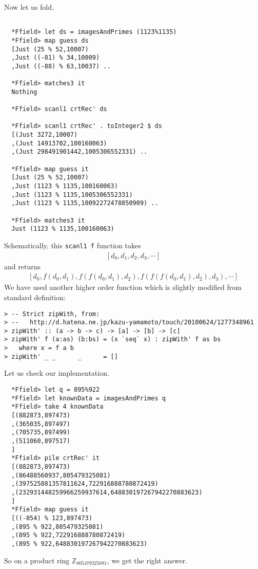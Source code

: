 \documentclass[11pt]{book}
\begin{document}
Now let us fold.
\begin{verbatim}

  *Ffield> let ds = imagesAndPrimes (1123%1135)
  *Ffield> map guess ds
  [Just (25 % 52,10007)
  ,Just ((-81) % 34,10009)
  ,Just ((-88) % 63,10037) ..

  *Ffield> matches3 it
  Nothing

  *Ffield> scanl1 crtRec' ds

  *Ffield> scanl1 crtRec' . toInteger2 $ ds
  [(Just 3272,10007)
  ,(Just 14913702,100160063)
  ,(Just 298491901442,1005306552331) ..

  *Ffield> map guess it
  [Just (25 % 52,10007)
  ,Just (1123 % 1135,100160063)
  ,Just (1123 % 1135,1005306552331)
  ,Just (1123 % 1135,10092272478850909) ..

  *Ffield> matches3 it
  Just (1123 % 1135,100160063)

\end{verbatim}
Schematically, this \texttt{scanl1 f} function takes
\begin{eqnarray}
\left[d_0, d_1, d_2, d_3, \cdots \right]
\end{eqnarray}
and returns
\begin{eqnarray}
\left[d_0, f(d_0,d_1), f(f(d_0,d_1),d_2), f(f(f(d_0,d_1),d_2), d_3), \cdots \right]
\end{eqnarray}
We have used another higher order function which is slightly modified from standard definition:
\begin{verbatim}
> -- Strict zipWith, from:
> --   http://d.hatena.ne.jp/kazu-yamamoto/touch/20100624/1277348961
> zipWith' :: (a -> b -> c) -> [a] -> [b] -> [c]
> zipWith' f (a:as) (b:bs) = (x `seq` x) : zipWith' f as bs
>   where x = f a b
> zipWith' _ _      _      = []
\end{verbatim}

Let us check our implementation.
\begin{verbatim}
  *Ffield> let q = 895%922
  *Ffield> let knownData = imagesAndPrimes q
  *Ffield> take 4 knownData 
  [(882873,897473)
  ,(365035,897497)
  ,(705735,897499)
  ,(511060,897517)
  ]
  *Ffield> pile crtRec' it
  [(882873,897473)
  ,(86488560937,805479325081)
  ,(397525881357811624,722916888780872419)
  ,(232931448259966259937614,648830197267942270883623)
  ]
  *Ffield> map guess it
  [((-854) % 123,897473)
  ,(895 % 922,805479325081)
  ,(895 % 922,722916888780872419)
  ,(895 % 922,648830197267942270883623)
\end{verbatim}
So on a product ring $\mathbb{Z}_{805479325081}$, we get the right answer.
\end{document}
